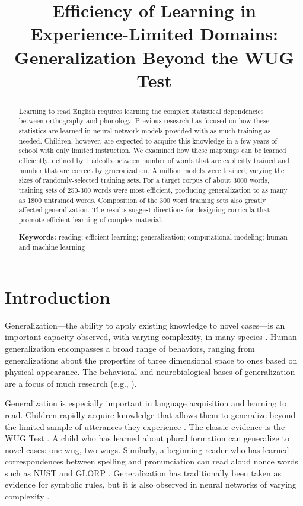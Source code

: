 \documentclass[10pt,letterpaper]{article}
\title{Efficiency of Learning in Experience-Limited Domains:\\Generalization Beyond the WUG Test}
\author{%
	{\large \bf Christopher R.~Cox (chriscox@lsu.edu)} \\
  	Department of Psychology, Louisiana State University \\
  	1005 Field House Dr, Baton Rouge, LA 70802 USA
  \AND%
	{\large \bf Matthew Cooper~Borkenhagen \and Mark S.~Seidenberg} \\
	Department of Psychology, University of Wisconsin-Madison\\
	1202 W. Johnson Street, Madison, WI 53706 USA
}
\newcommand{\exword}[1]{\MakeUppercase{#1}}
\begin{document}
\maketitle


\begin{abstract}
Learning to read English requires learning the complex statistical dependencies between orthography and phonology. Previous research has focused on how these statistics are learned in neural network models provided with as much training as needed. Children, however, are expected to acquire this knowledge in a few years of school with only limited instruction. We examined how these mappings can be learned efficiently, defined by tradeoffs between number of words that are explicitly trained and number that are correct by generalization. A million models were trained, varying the sizes of randomly-selected training sets. For a target corpus of about 3000 words, training sets of 250-300 words were most efficient, producing generalization to as many as 1800 untrained words. Composition of the 300 word training sets also greatly affected generalization. The results suggest directions for designing curricula that promote efficient learning of complex material. 

\textbf{Keywords:} 
reading; efficient learning; generalization; computational modeling; human and machine learning
\end{abstract}


\section{Introduction}

Generalization---the ability to apply existing knowledge to novel cases---is an important capacity observed, with varying complexity, in many species \cite{Santolin2018}. Human generalization encompasses a broad range of behaviors, ranging from generalizations about the properties of three dimensional space to ones based on physical appearance.  The behavioral and neurobiological bases of generalization are a focus of much research (e.g., ).

Generalization is especially important in language acquisition and learning to read. Children rapidly acquire knowledge that allows them to generalize beyond the limited sample of utterances they experience \cite{Chomsky1965}. The classic evidence is the WUG Test \cite{Berko1958}. A child who has learned about plural formation can generalize to novel cases: one wug, two wugs. Similarly, a beginning reader who has learned correspondences between spelling and pronunciation can read aloud nonce words such as \exword{nust} and \exword{glorp} \cite{Seidenberg1989}.  Generalization has traditionally been taken as evidence for symbolic rules, but it is also observed in neural networks of varying complexity \cite{Seidenberg2014}.  
\end{document}

